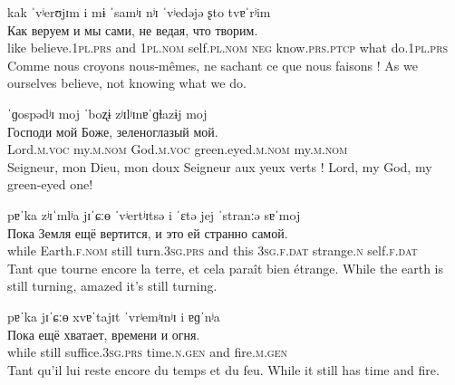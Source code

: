\documentclass[12pt]{article}
\begin{document}
\begin{exe}
    \glll
    kak ˈvʲerʊjɪm i mɨ ˈsamʲɪ nʲɪ ˈvʲedəjə ʂto tvɐˈrʲim\\
    Как веруем и мы сами, не ведая, что творим.\\
    like believe.1\textsc{pl.prs} and 1\textsc{pl.nom} self.\textsc{pl.nom} \textsc{neg} know.\textsc{prs.ptcp} what do.1\textsc{pl.prs}\\
    \trans
    Comme nous croyons nous-mêmes, ne sachant ce que nous faisons !
    \trans
    As we ourselves believe, not knowing what we do.
\end{exe}

\dotfill

\begin{exe}
    \glll
    ˈɡospədʲɪ moj ˈboʐɨ zʲɪlʲɪnɐˈɡɫazɨj moj\\
    Господи мой Боже, зеленоглазый мой.\\
    Lord.\textsc{m.voc} my.\textsc{m.nom} God.\textsc{m.voc} green.eyed.\textsc{m.nom} my.\textsc{m.nom}\\
    \trans
    Seigneur, mon Dieu, mon doux Seigneur aux yeux verts !
    \trans
    Lord, my God, my green-eyed one!
\end{exe}

\begin{exe}
    \glll
    pɐˈka zʲɪˈmlʲa jɪˈɕːɵ ˈvʲertʲɪtsə i ˈɛtə jej ˈstranːə sɐˈmoj\\
    Пока Земля ещё вертится, и это ей странно самой.\\
    while Earth.\textsc{f.nom} still turn.3\textsc{sg.prs} and this 3\textsc{sg.f.dat} strange.\textsc{n} self.\textsc{f.dat}\\
    \trans
    Tant que tourne encore la terre, et cela paraît bien étrange.
    \trans
    While the earth is still turning, amazed it's still turning.
\end{exe}

\begin{exe}
    \glll
    pɐˈka jɪˈɕːɵ xvɐˈtajɪt ˈvrʲemʲɪnʲɪ i ɐɡˈnʲa\\
    Пока ещё хватает, времени и огня.\\
    while still suffice.3\textsc{sg.prs} time.\textsc{n.gen} and fire.\textsc{m.gen}\\
    \trans
    Tant qu'il lui reste encore du temps et du feu.
    \trans
    While it still has time and fire.
\end{exe}
\end{document}

